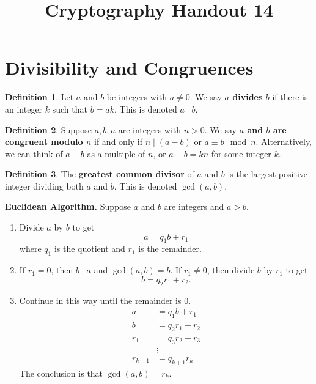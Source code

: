 \documentclass[12pt]{amsart}
\makeatletter
\def\subtitle#1{\gdef\@subtitle{#1}}
\def\@subtitle{}
\theoremstyle{plain}
\theoremstyle{definition}
\newtheorem*{defn}{Definition}
\theoremstyle{remark}
\makeatother
\begin{document}
\onehalfspacing

\title[]{Cryptography Handout 14}
\subtitle{Summary: Key Number Theory Definitions and Results}
\maketitle

\section{Divisibility and Congruences}
\begin{defn}
Let $a$ and $b$ be integers with $a \neq 0$.  We say \textbf{$a$ divides $b$} if there is an integer $k$ such that $b = ak$.  This is denoted $a \mid b$.
\end{defn}

\begin{defn}
Suppose $a,b,n$ are integers with $n > 0$.  We say \textbf{$a$ and $b$ are congruent modulo $n$} if and only if $n \mid (a-b)$ or $a \equiv b \mod n$.  Alternatively, we can think of $a-b$ as a multiple of $n$, or $a-b = kn$ for some integer $k$.
\end{defn}

\begin{defn}
The \textbf{greatest common divisor} of $a$ and $b$ is the largest positive integer dividing both $a$ and $b$.  This is denoted $\gcd(a,b)$.
\end{defn}

\noindent\textbf{Euclidean Algorithm.}  Suppose $a$ and $b$ are integers and $a > b$.
\begin{enumerate}[1.]
	\item Divide $a$ by $b$ to get $$a = q_1b + r_1$$ where $q_1$ is the quotient and $r_1$ is the remainder.
	\item If $r_1 = 0$, then $b \mid a$ and $\gcd(a,b) = b$.  If $r_1 \neq 0$, then divide $b$ by $r_1$ to get $$b = q_2r_1+r_2.$$
	\item Continue in this way until the remainder is 0.
	\begin{align*}
	a &= q_1 b + r_1\\
	b &= q_2 r_1 + r_2\\
	r_1 &= q_3 r_2 + r_3\\
	&\vdots\\
	r_{k-1} &= q_{k+1}r_k
	\end{align*}
	The conclusion is that $\gcd(a,b) = r_k$.
\end{enumerate}
\end{document}
